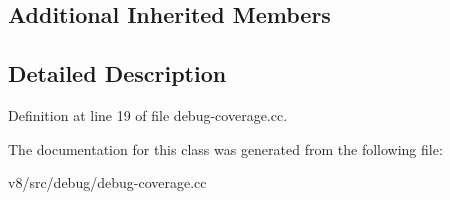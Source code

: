 \subsection*{Additional Inherited Members}


\subsection{Detailed Description}


Definition at line 19 of file debug-\/coverage.\+cc.



The documentation for this class was generated from the following file\+:\begin{DoxyCompactItemize}
\item 
v8/src/debug/debug-\/coverage.\+cc\end{DoxyCompactItemize}
